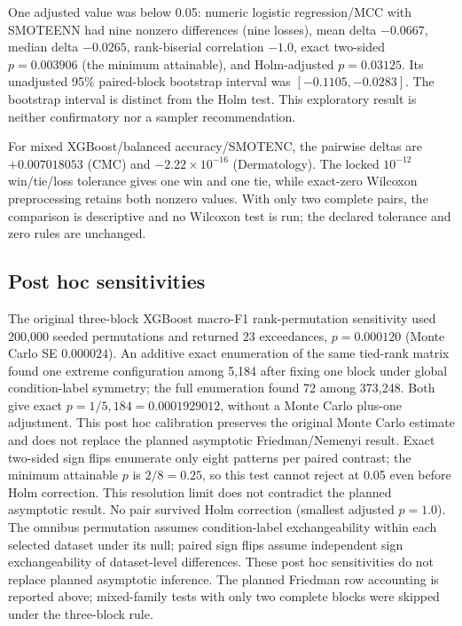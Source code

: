 \documentclass[10pt]{article}
\begin{document}
One adjusted value was below 0.05: numeric logistic regression/MCC with SMOTEENN had nine nonzero differences (nine losses), mean delta $-0.0667$, median delta $-0.0265$, rank-biserial correlation $-1.0$, exact two-sided $p=0.003906$ (the minimum attainable), and Holm-adjusted $p=0.03125$. Its unadjusted 95\% paired-block bootstrap interval was $[-0.1105,-0.0283]$. The bootstrap interval is distinct from the Holm test. This exploratory result is neither confirmatory nor a sampler recommendation.

For mixed XGBoost/balanced accuracy/SMOTENC, the pairwise deltas are $+0.007018053$ (CMC) and $-2.22\times10^{-16}$ (Dermatology). The locked $10^{-12}$ win/tie/loss tolerance gives one win and one tie, while exact-zero Wilcoxon preprocessing retains both nonzero values. With only two complete pairs, the comparison is descriptive and no Wilcoxon test is run; the declared tolerance and zero rules are unchanged.

\subsection{Post hoc sensitivities}

The original three-block XGBoost macro-F1 rank-permutation sensitivity used 200,000 seeded permutations and returned 23 exceedances, $p=0.000120$ (Monte Carlo SE $0.000024$). An additive exact enumeration of the same tied-rank matrix found one extreme configuration among 5,184 after fixing one block under global condition-label symmetry; the full enumeration found 72 among 373,248. Both give exact $p=1/5{,}184=0.0001929012$, without a Monte Carlo plus-one adjustment. This post hoc calibration preserves the original Monte Carlo estimate and does not replace the planned asymptotic Friedman/Nemenyi result. Exact two-sided sign flips enumerate only eight patterns per paired contrast; the minimum attainable $p$ is $2/8=0.25$, so this test cannot reject at 0.05 even before Holm correction. This resolution limit does not contradict the planned asymptotic result. No pair survived Holm correction (smallest adjusted $p=1.0$). The omnibus permutation assumes condition-label exchangeability within each selected dataset under its null; paired sign flips assume independent sign exchangeability of dataset-level differences. These post hoc sensitivities do not replace planned asymptotic inference. The planned Friedman row accounting is reported above; mixed-family tests with only two complete blocks were skipped under the three-block rule.
\end{document}
